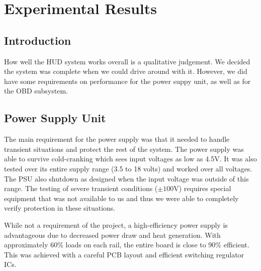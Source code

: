\chapter{Experimental Results}


\section{Introduction}

How well the HUD system works overall is a qualitative judgement. We decided the system
was complete when we could drive around with it.
However, we did have some requirements on performance for the power suppy unit, as well
as for the OBD subsystem.

\section{Power Supply Unit}

The main requirement for the power supply was that it needed to handle transient 
situations and protect the rest of the system.  The power supply was able to survive
cold-cranking which sees input voltages as low as 4.5V.  It was also tested
over its entire supply range (3.5 to 18 volts) and worked over all voltages.  The PSU
also shutdown as designed when the input voltage was outside of this range.  The 
testing of severe transient conditions ($\pm 100$V) requires special equipment that was
not available to us and thus we were able to completely verify protection in these
situations.

While not a requirement of the project, a high-efficiency power supply is advantageous 
due to decreased power draw and heat generation.  With approximately 60\% loads on 
each rail, the entire board is close to 90\% efficient.  This was achieved with a 
careful PCB layout and efficient switching regulator ICs.

